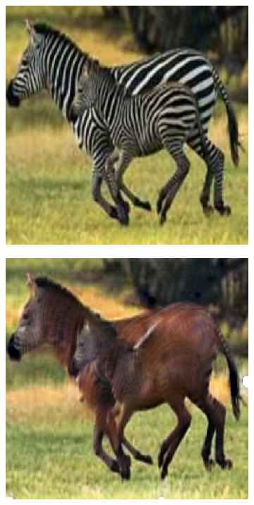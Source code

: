 \begin{figure}
\begin{subfigure}[t]{.2\textwidth}
  \end{subfigure}
  \hfill
  \begin{subfigure}[t]{.2\textwidth}
    \centering
    \includegraphics[width=\linewidth]{images/cycleGanResults/zebra_input1.png}
  \end{subfigure}
  \begin{subfigure}[t]{.2\textwidth}
    \centering
    \includegraphics[width=\linewidth]{images/cycleGanResults/zebra_output1.png}
  \end{subfigure}


\end{figure}
